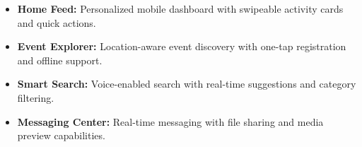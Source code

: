 \begin{itemize}
    \item \textbf{Home Feed:} Personalized mobile dashboard with swipeable activity cards and quick actions.
    
    \item \textbf{Event Explorer:} Location-aware event discovery with one-tap registration and offline support.
    
    \item \textbf{Smart Search:} Voice-enabled search with real-time suggestions and category filtering.
    
    \item \textbf{Messaging Center:} Real-time messaging with file sharing and media preview capabilities.
\end{itemize}

